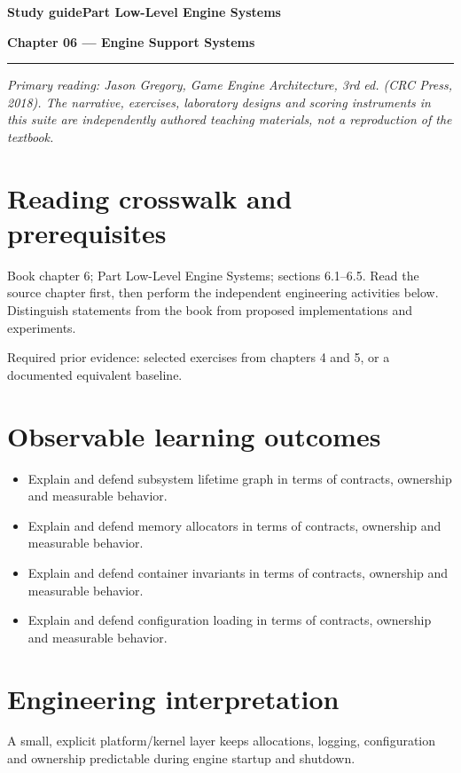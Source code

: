 \documentclass[11pt,letterpaper]{article}
\newcommand{\DocType}{Reference}
\newcommand{\SuiteHeading}[3]{%
\renewcommand{\DocType}{#2}%
{\small\bfseries\sffamily\color{EngineTeal}#2\hfill #3}\par\vspace{6pt}
{\LARGE\bfseries\color{EngineBlue}#1}\par\vspace{4pt}
{\color{EngineTeal}\rule{\linewidth}{1pt}}\par\vspace{7pt}}
\newcommand{\SourceNote}{\footnotesize\textit{Primary reading: Jason Gregory, \emph{Game Engine Architecture}, 3rd ed. (CRC Press, 2018). The narrative, exercises, laboratory designs and scoring instruments in this suite are independently authored teaching materials, not a reproduction of the textbook.}\normalsize\par}
\begin{document}
\SuiteHeading{Chapter 06 — Engine Support Systems}{Study guide}{Part Low-Level Engine Systems}
\SourceNote
\section{Reading crosswalk and prerequisites}
Book chapter 6; Part Low-Level Engine Systems; sections 6.1--6.5. Read the source chapter first, then perform the independent engineering activities below. Distinguish statements from the book from proposed implementations and experiments.

Required prior evidence: selected exercises from chapters 4 and 5, or a documented equivalent baseline.

\section{Observable learning outcomes}
\begin{itemize}
\item Explain and defend subsystem lifetime graph in terms of contracts, ownership and measurable behavior.
\item Explain and defend memory allocators in terms of contracts, ownership and measurable behavior.
\item Explain and defend container invariants in terms of contracts, ownership and measurable behavior.
\item Explain and defend configuration loading in terms of contracts, ownership and measurable behavior.
\end{itemize}
\section{Engineering interpretation}
A small, explicit platform/kernel layer keeps allocations, logging, configuration and ownership predictable during engine startup and shutdown.
\end{document}
